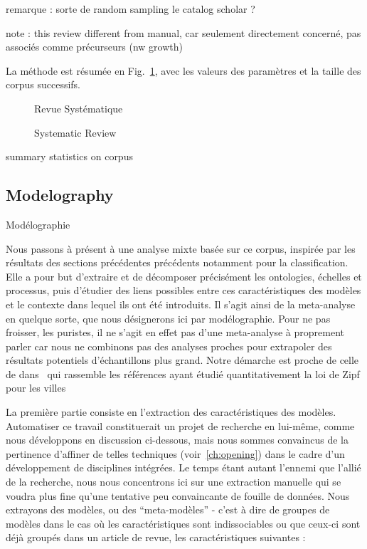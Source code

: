 remarque : sorte de random sampling le catalog scholar ?

note : this review different from manual, car seulement directement concerné, pas associés comme précurseurs (nw growth)

La méthode est résumée en Fig.~\ref{fig:modelography:systematicreview}, avec les valeurs des paramètres et la taille des corpus successifs. 


\begin{figure}
%
\caption{Systematic Review}{Revue Systématique}
\label{fig:modelography:systematicreview}
\end{figure}




summary statistics on corpus




\subsection{Modelography}{Modélographie}


Nous passons à présent à une analyse mixte basée sur ce corpus, inspirée par les résultats des sections précédentes précédents notamment pour la classification. Elle a pour but d'extraire et de décomposer précisément les ontologies, échelles et processus, puis d'étudier des liens possibles entre ces caractéristiques des modèles et le contexte dans lequel ils ont été introduits. Il s'agit ainsi de la meta-analyse en quelque sorte, que nous désignerons ici par modélographie. Pour ne pas froisser, les puristes, il ne s'agit en effet pas d'une meta-analyse à proprement parler car nous ne combinons pas des analyses proches pour extrapoler des résultats potentiels d'échantillons plus grand. Notre démarche est proche de celle de  dans~\cite{2016arXiv160606162C} qui rassemble les références ayant étudié quantitativement la loi de Zipf pour les villes


La première partie consiste en l'extraction des caractéristiques des modèles. Automatiser ce travail constituerait un projet de recherche en lui-même, comme nous développons en discussion ci-dessous, mais nous sommes convaincus de la pertinence d'affiner de telles techniques (voir~\ref{ch:opening}) dans le cadre d'un développement de disciplines intégrées. Le temps étant autant l'ennemi que l'allié de la recherche, nous nous concentrons ici sur une extraction manuelle qui se voudra plus fine qu'une tentative peu convaincante de fouille de données. Nous extrayons des modèles, ou des ``meta-modèles'' - c'est à dire de groupes de modèles dans le cas où les caractéristiques sont indissociables ou que ceux-ci sont déjà groupés dans un article de revue, les caractéristiques suivantes :

